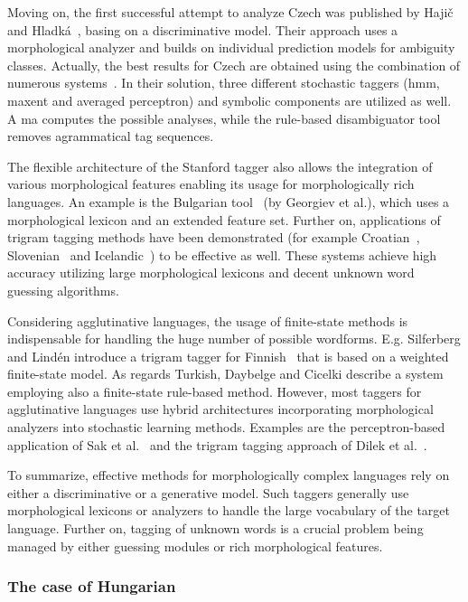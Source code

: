 Moving on, the first successful attempt to analyze Czech was published by Hajič and Hladká~\cite{Hajic1998a}, basing on a discriminative model.
Their approach uses a morphological analyzer and builds on individual prediction models for ambiguity classes.
Actually, the best results for Czech are obtained using the combination of numerous systems~\cite{Hajic2007}.
In their solution, three different stochastic taggers (\acrshort{hmm}, \acrlong{maxent} and averaged perceptron) and symbolic components are utilized as well.
A \acrshort{ma} computes the possible analyses, while the rule-based disambiguator tool removes agrammatical tag sequences. 

The flexible architecture of the Stanford tagger \cite{Toutanova2003} also allows the integration of various morphological features enabling its usage for morphologically rich languages.
An example is the Bulgarian tool~\cite{Georgiev2012} (by Georgiev et al.), which uses a morphological lexicon and an extended feature set.
Further on, applications of trigram tagging methods \cite{Brants2000,Halacsy2007} have been demonstrated (for example Croatian~\cite{Agic2013}, Slovenian~\cite{Agic2013} and Icelandic~\cite{Loftsson2007}) to be effective as well.
These systems achieve high accuracy utilizing large morphological lexicons and decent unknown word guessing algorithms.

Considering agglutinative languages, the usage of finite-state methods is indispensable for handling the huge number of possible wordforms.
E.g. Silferberg and Lindén introduce a trigram tagger for Finnish~\cite{Silfverberg2011} that is based on a weighted finite-state model.
As regards Turkish, Daybelge and Cicelki describe a system~\cite{Daybelge2007} employing also a finite-state rule-based method.
However, most taggers for agglutinative languages use hybrid architectures incorporating morphological analyzers into stochastic learning methods.
Examples are the perceptron-based application of Sak et al.~\cite{Sak2007} and the trigram tagging approach of Dilek et al.~\cite{Hakkani-Tur2002}.

To summarize, effective methods for morphologically complex languages rely on either a discriminative or a generative model.
Such taggers generally use morphological lexicons or analyzers to handle the large vocabulary of the target language.
Further on, tagging of unknown words is a crucial problem being managed by either guessing modules or rich morphological features. 

\subsubsection{The case of Hungarian}

